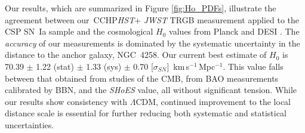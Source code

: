 \documentclass[12pt,modern]{aastex631}
\newcommand{\cchp}{\,CCHP\xspace}
\newcommand{\csp}{\,CSP\xspace}
\newcommand{\ho}{$H_{0}$\xspace}
\newcommand{\hounits}{\,km\,s$^{-1}$\,Mpc$^{-1}$\xspace}
\newcommand{\hst}{\emph{HST}\xspace}
\newcommand{\jwst}{\emph{JWST}\xspace}
\newcommand{\sn}{SN~Ia\xspace}
\newcommand{\shoes}{\emph{SHoES}\xspace}
\newcommand{\ngc}{NGC\,\xspace}
\begin{document}
Our results, which are summarized in Figure \ref{fig:Ho_PDFs}, illustrate the agreement between our \cchp \hst + \jwst TRGB measurement applied to the \csp \sn sample and the cosmological \ho values from Planck \citep{planck_2018} and DESI \citep{DESI_2024}. The {\it accuracy} of our measurements is dominated by the systematic uncertainty in the distance to the anchor galaxy, \ngc 4258. Our current best estimate of \ho is  70.39 $\pm$ 1.22 (stat) $\pm$  1.33 (sys) $\pm$ 0.70 [$\sigma_{SN}$] \hounits. This value falls between that obtained from studies of the CMB, from BAO measurements calibrated by BBN, and the \shoes value, all without significant tension. While our results show consistency with $\Lambda$CDM, continued improvement to the local distance scale is essential for further reducing both systematic and statistical uncertainties. 
\end{document}
